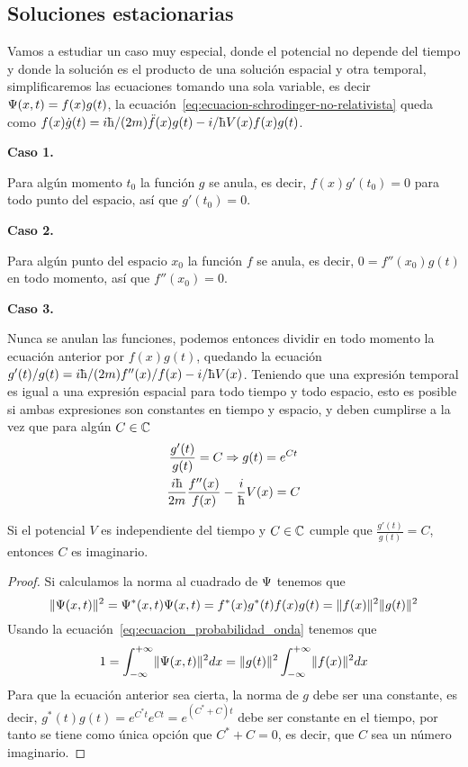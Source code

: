 \subsection{Soluciones estacionarias}\label{subsec:soluciones-estacionarias}
Vamos a estudiar un caso muy especial, donde el potencial no depende del tiempo y donde la solución es el producto de una solución espacial y otra temporal, simplificaremos las ecuaciones tomando una sola variable, es decir $\Psi(x,t)=f(x)g(t)$, la ecuación~\eqref{eq:ecuacion-schrodinger-no-relativista} queda como $f(x)\dot{g}(t)=i\planckbarsymbol/(2m)\ddot{f}(x)g(t)-i/\planckbarsymbol V(x)f(x)g(t)$.


\textbf{Caso 1.}

Para algún momento $t_0$ la función $g$ se anula, es decir, $f(x)g'(t_0)=0$ para todo punto del espacio, así que $g'(t_0)=0$.

\textbf{Caso 2.}

Para algún punto del espacio $x_0$ la función $f$ se anula, es decir, $0=f''(x_0)g(t)$ en todo momento, así que $f''(x_0)=0$.

\textbf{Caso 3.}

Nunca se anulan las funciones, podemos entonces dividir en todo momento la ecuación anterior por $f(x)g(t)$, quedando la ecuación $g'(t)/g(t)=i\planckbarsymbol/(2m)f^{\prime\prime}(x)/f(x)-i/\planckbarsymbol V(x)$.
Teniendo que una expresión temporal es igual a una expresión espacial para todo tiempo y todo espacio, esto es posible si ambas expresiones son constantes en tiempo y espacio, y deben cumplirse a la vez que para algún $C\in\mathbb{C}$
\begin{gather*}
    \frac{g'(t)}{g(t)}=C\Rightarrow g(t)=e^{Ct}
    \\
    \frac{i\planckbarsymbol}{2m}\frac{f''(x)}{f(x)}-\frac{i}{\planckbarsymbol}V(x)=C
\end{gather*}

\begin{proposition}
    Si el potencial $V$ es independiente del tiempo y $C\in\mathbb{C}$ cumple que $\frac{g'(t)}{g(t)}=C$, entonces $C$ es imaginario.
\end{proposition}
\begin{proof}
    Si calculamos la norma al cuadrado de $\Psi$ tenemos que
    \begin{equation*}
        \lVert\Psi(x,t)\rVert^2=\Psi^*(x,t)\Psi(x,t)=f^*(x)g^*(t)f(x)g(t)=\lVert f(x)\rVert^2\lVert g(t)\rVert^2
    \end{equation*}
    Usando la ecuación~\eqref{eq:ecuacion_probabilidad_onda} tenemos que
    \begin{equation*}
        1=\int_{-\infty}^{+\infty}\lVert\Psi(x,t)\rVert^2 dx=\lVert g(t)\rVert^2\int_{-\infty}^{+\infty}\lVert f(x)\rVert^2 dx
    \end{equation*}
    Para que la ecuación anterior sea cierta, la norma de $g$ debe ser una constante, es decir, $g^*(t)g(t)=e^{C^*t}e^{Ct}=e^{(C^*+C)t}$ debe ser constante en el tiempo, por tanto se tiene como única opción que $C^*+C=0$, es decir, que $C$ sea un número imaginario.
\end{proof}

